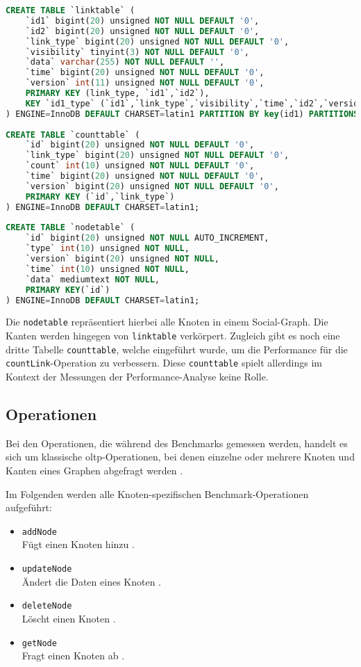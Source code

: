 \begin{lstlisting}[caption={Linkbench MySQL-Schema},language=SQL,label=src:linkbench_mysql]
CREATE TABLE `linktable` (
    `id1` bigint(20) unsigned NOT NULL DEFAULT '0',
    `id2` bigint(20) unsigned NOT NULL DEFAULT '0',
    `link_type` bigint(20) unsigned NOT NULL DEFAULT '0',
    `visibility` tinyint(3) NOT NULL DEFAULT '0',
    `data` varchar(255) NOT NULL DEFAULT '',
    `time` bigint(20) unsigned NOT NULL DEFAULT '0',
    `version` int(11) unsigned NOT NULL DEFAULT '0',
    PRIMARY KEY (link_type, `id1`,`id2`),
    KEY `id1_type` (`id1`,`link_type`,`visibility`,`time`,`id2`,`version`,`data`)
) ENGINE=InnoDB DEFAULT CHARSET=latin1 PARTITION BY key(id1) PARTITIONS 16;
    
CREATE TABLE `counttable` (
    `id` bigint(20) unsigned NOT NULL DEFAULT '0',
    `link_type` bigint(20) unsigned NOT NULL DEFAULT '0',
    `count` int(10) unsigned NOT NULL DEFAULT '0',
    `time` bigint(20) unsigned NOT NULL DEFAULT '0',
    `version` bigint(20) unsigned NOT NULL DEFAULT '0',
    PRIMARY KEY (`id`,`link_type`)
) ENGINE=InnoDB DEFAULT CHARSET=latin1;
    
CREATE TABLE `nodetable` (
    `id` bigint(20) unsigned NOT NULL AUTO_INCREMENT,
    `type` int(10) unsigned NOT NULL,
    `version` bigint(20) unsigned NOT NULL,
    `time` int(10) unsigned NOT NULL,
    `data` mediumtext NOT NULL,
    PRIMARY KEY(`id`)
) ENGINE=InnoDB DEFAULT CHARSET=latin1;
\end{lstlisting}
Die \texttt{nodetable} repräsentiert hierbei alle Knoten in einem Social-Graph. Die Kanten werden hingegen von \texttt{linktable} verkörpert. Zugleich gibt es noch eine dritte Tabelle \texttt{counttable}, welche eingeführt wurde, um die Performance für die \texttt{countLink}-Operation zu verbessern. Diese \texttt{counttable} spielt allerdings im Kontext der Messungen der Performance-Analyse keine Rolle.

\subsection{Operationen}
\label{linkbench:operationen}
Bei den Operationen, die während des Benchmarks gemessen werden, handelt es sich um klassische \acs{oltp}-Operationen, bei denen einzelne oder mehrere Knoten und Kanten eines Graphen abgefragt werden \cite{snb_paper}. 

Im Folgenden werden alle Knoten-spezifischen Benchmark-Operationen aufgeführt:
\begin{itemize}
    \item \texttt{addNode}\\
    Fügt einen Knoten hinzu \cite{fb_linkbench_github}.
    \item \texttt{updateNode}\\
    Ändert die Daten eines Knoten \cite{fb_linkbench_github}.
    \item \texttt{deleteNode}\\
    Löscht einen Knoten \cite{fb_linkbench_github}.
    \item \texttt{getNode}\\
    Fragt einen Knoten ab \cite{fb_linkbench_github}.
\end{itemize}

